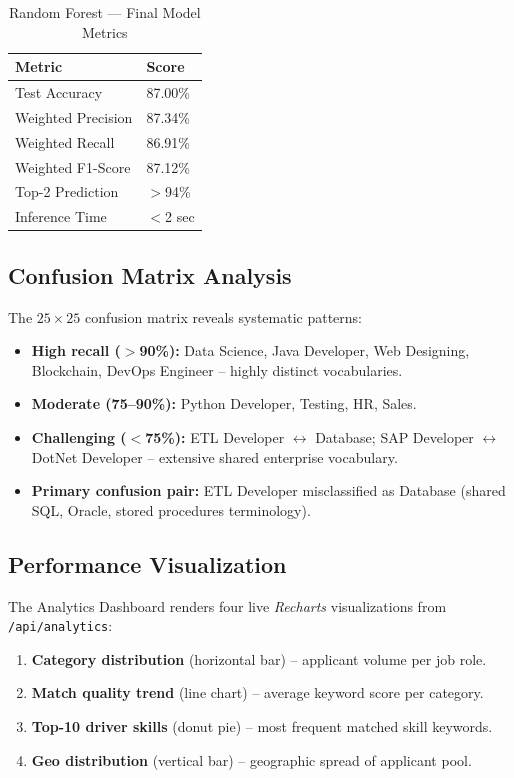 \documentclass[10pt,twocolumn]{article}
\begin{document}
\begin{table}[H]
\centering
\caption{Random Forest — Final Model Metrics}
\label{tab:rfmetrics}
\small
\begin{tabular}{@{}L{2.8cm}R{1.5cm}@{}}
\toprule
{}\textbf{Metric} & \textbf{Score} \\
\midrule
Test Accuracy        & 87.00\% \\
Weighted Precision   & 87.34\% \\
Weighted Recall      & 86.91\% \\
Weighted F1-Score    & 87.12\% \\
Top-2 Prediction     & $>$94\%  \\
Inference Time       & $<$2 sec \\
\bottomrule
\end{tabular}
\end{table}

\subsection{Confusion Matrix Analysis}

The $25 \times 25$ confusion matrix reveals systematic patterns:

\begin{itemize}
  \item \textbf{High recall ($>$90\%):} Data Science, Java Developer, Web Designing, Blockchain, DevOps Engineer -- highly distinct vocabularies.
  \item \textbf{Moderate (75--90\%):} Python Developer, Testing, HR, Sales.
  \item \textbf{Challenging ($<$75\%):} ETL Developer $\leftrightarrow$ Database; SAP Developer $\leftrightarrow$ DotNet Developer -- extensive shared enterprise vocabulary.
  \item \textbf{Primary confusion pair:} ETL Developer misclassified as Database (shared SQL, Oracle, stored procedures terminology).
\end{itemize}

\subsection{Performance Visualization}

The Analytics Dashboard renders four live \textit{Recharts} visualizations from \texttt{/api/analytics}:

\begin{enumerate}
  \item \textbf{Category distribution} (horizontal bar) -- applicant volume per job role.
  \item \textbf{Match quality trend} (line chart) -- average keyword score per category.
  \item \textbf{Top-10 driver skills} (donut pie) -- most frequent matched skill keywords.
  \item \textbf{Geo distribution} (vertical bar) -- geographic spread of applicant pool.
\end{enumerate}
\end{document}
